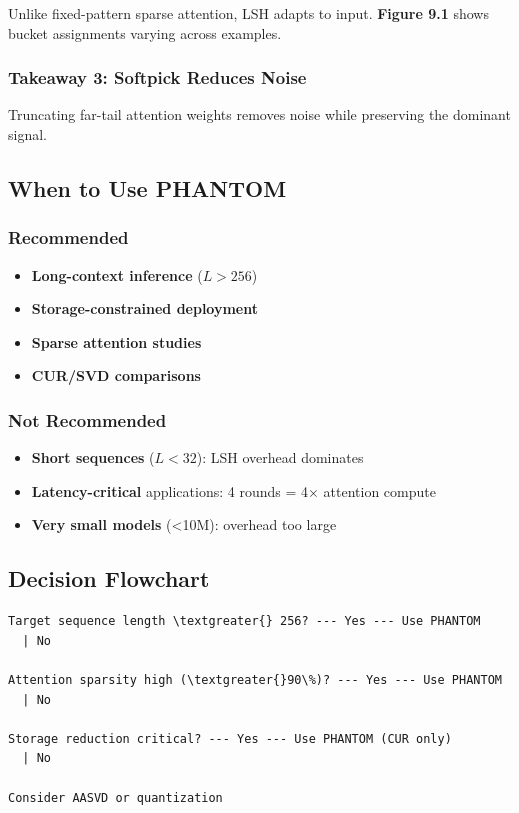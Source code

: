 Unlike fixed-pattern sparse attention, LSH adapts to input. \textbf{Figure 9.1} 
shows bucket assignments varying across examples.

\subsubsection{Takeaway 3: Softpick Reduces Noise}

Truncating far-tail attention weights removes noise while preserving the 
dominant signal.

\subsection{When to Use PHANTOM}

\subsubsection{Recommended}

\begin{itemize}
\item \textbf{Long-context inference} ($L > 256$)
\item \textbf{Storage-constrained deployment}
\item \textbf{Sparse attention studies}
\item \textbf{CUR/SVD comparisons}

\end{itemize}
\subsubsection{Not Recommended}

\begin{itemize}
\item \textbf{Short sequences} ($L < 32$): LSH overhead dominates
\item \textbf{Latency-critical} applications: 4 rounds = 4$\times$ attention compute
\item \textbf{Very small models} (\textless{}10M): overhead too large

\end{itemize}
\subsection{Decision Flowchart}

\begin{lstlisting}
Target sequence length \textgreater{} 256? --- Yes --- Use PHANTOM
  | No
   
Attention sparsity high (\textgreater{}90\%)? --- Yes --- Use PHANTOM
  | No
   
Storage reduction critical? --- Yes --- Use PHANTOM (CUR only)
  | No
   
Consider AASVD or quantization
\end{lstlisting}

